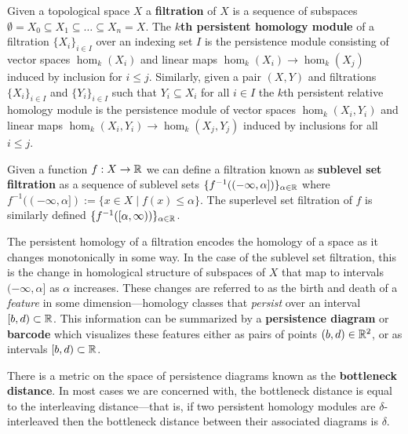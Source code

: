 
Given a topological space $X$ a \textbf{filtration} of $X$ is a sequence of subspaces $\emptyset = X_0\subseteq X_1\subseteq\ldots\subseteq X_n = X$.
The \textbf{$k$th persistent homology module} of a filtration $\{X_i\}_{i\in I}$ over an indexing set $I$ is the persistence module consisting of vector spaces $\hom_k(X_i)$ and linear maps $\hom_k(X_i)\to \hom_k(X_j)$ induced by inclusion for $i\leq j$.
Similarly, given a pair $(X,Y)$ and filtrations $\{X_i\}_{i\in I}$ and $\{Y_i\}_{i\in I}$ such that $Y_i\subseteq X_i$ for all $i\in I$ the $k$th persistent relative homology module is the persistence module of vector spaces $\hom_k(X_i, Y_i)$ and linear maps $\hom_k(X_i, Y_i)\to\hom_k(X_j, Y_j)$ induced by inclusions for all $i\leq j$.

Given a function $f: X\to \mathbb{R}$ we can define a filtration known as \textbf{sublevel set filtration} as a sequence of sublevel sets $\{f^{-1}((-\infty, \alpha])\}_{\alpha\in\mathbb{R}}$ where $f^{-1}((-\infty, \alpha]) := \{x\in X\mid f(x)\leq\alpha\}$.
The superlevel set filtration of $f$ is similarly defined $\{f^{-1}([\alpha,\infty))\}_{\alpha\in\mathbb{R}}$.

The persistent homology of a filtration encodes the homology of a space as it changes monotonically in some way.
In the case of the sublevel set filtration, this is the change in homological structure of subspaces of $X$ that map to intervals $(-\infty,\alpha]$ as $\alpha$ increases.
These changes are referred to as the birth and death of a \emph{feature} in some dimension---homology classes that \emph{persist} over an interval $[b, d)\subset\mathbb{R}$.
This information can be summarized by a \textbf{persistence diagram} or \textbf{barcode} which visualizes these features either as pairs of points $(b, d)\in\mathbb{R}^2$, or as intervals $[b, d)\subset\mathbb{R}$.

There is a metric on the space of persistence diagrams known as the \textbf{bottleneck distance}.
In most cases we are concerned with, the bottleneck distance is equal to the interleaving distance---that is, if two persistent homology modules are $\delta$-interleaved then the bottleneck distance between their associated diagrams is $\delta$.
